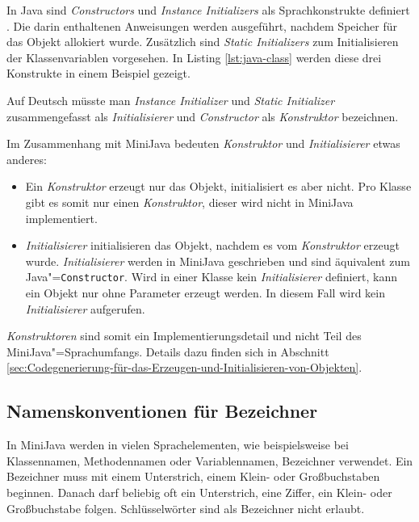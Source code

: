 In Java sind \emph{Constructors} und \emph{Instance Initializers} als Sprachkonstrukte definiert \cite{Java8Specification}. Die darin enthaltenen Anweisungen werden ausgeführt, nachdem Speicher für das Objekt allokiert wurde. Zusätzlich sind \emph{Static Initializers} zum Initialisieren der Klassenvariablen vorgesehen. In Listing \ref{lst:java-class} werden diese drei Konstrukte in einem Beispiel gezeigt.



Auf Deutsch müsste man \emph{Instance Initializer} und \emph{Static Initializer} zusammengefasst als \emph{Initialisierer} und \emph{Constructor} als \emph{Konstruktor} bezeichnen.

Im Zusammenhang mit MiniJava bedeuten \emph{Konstruktor} und \emph{Initialisierer} etwas anderes:
\begin{itemize}
    \item Ein \emph{Konstruktor} erzeugt nur das Objekt, initialisiert es aber nicht. Pro Klasse gibt es somit nur einen \emph{Konstruktor}, dieser wird nicht in MiniJava implementiert. 
    \item \emph{Initialisierer} initialisieren das Objekt, nachdem es vom \emph{Konstruktor} erzeugt wurde. \emph{Initialisierer} werden in MiniJava geschrieben und sind äquivalent zum Java"=\lstinline{Constructor}. Wird in einer Klasse kein \emph{Initialisierer} definiert, kann ein Objekt nur ohne Parameter erzeugt werden. In diesem Fall wird kein \emph{Initialisierer} aufgerufen.
\end{itemize}

\emph{Konstruktoren} sind somit ein Implementierungsdetail und nicht Teil des MiniJava"=Sprachumfangs. Details dazu finden sich in Abschnitt \ref{sec:Codegenerierung-für-das-Erzeugen-und-Initialisieren-von-Objekten}.

\subsection{Namenskonventionen für Bezeichner}
In MiniJava werden in vielen Sprachelementen, wie beispielsweise bei Klassennamen, Methodennamen oder Variablennamen, Bezeichner verwendet. Ein Bezeichner muss mit einem Unterstrich, einem Klein- oder Großbuchstaben beginnen. Danach darf beliebig oft ein Unterstrich, eine Ziffer, ein Klein- oder Großbuchstabe folgen. Schlüsselwörter sind als Bezeichner nicht erlaubt.

